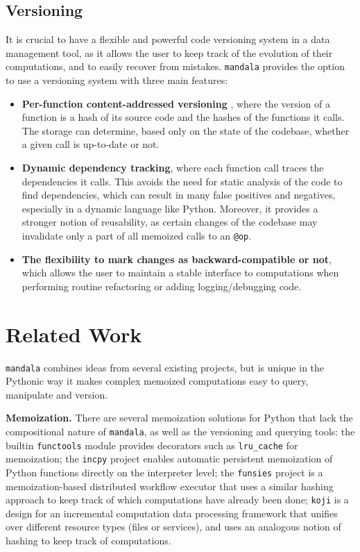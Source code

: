 \documentclass{article} %
\begin{document}
\subsection{Versioning}
\label{subsection:versioning}

It is crucial to have a flexible and powerful code versioning system in a data
management tool, as it allows the user to keep track of the evolution of their
computations, and to easily recover from mistakes. \texttt{mandala} provides the
option to use a versioning system with three main features:
\begin{itemize}
\item \textbf{Per-function content-addressed versioning} \citep{git,lozano2017unison}, where
the version of a function is a hash of its source code and the hashes of the
functions it calls. The storage can determine, based only on the state of the
codebase, whether a given call is up-to-date or not.
\item \textbf{Dynamic dependency tracking}, where each function call traces the
dependencies it calls. This avoids the need for static analysis of the code to
find dependencies, which can result in many false positives and negatives,
especially in a dynamic language like Python. Moreover, it provides a stronger
notion of reusability, as certain changes of the codebase may invalidate only
a part of all memoized calls to an \texttt{@op}.
\item \textbf{The flexibility to mark changes as backward-compatible or not},
which allows the user to maintain a stable interface to computations when performing routine refactoring or adding logging/debugging code.
\end{itemize}

\section{Related Work}
\label{section:related-work}

\texttt{mandala} combines ideas from several existing projects, but is unique in
the Pythonic way it makes complex memoized computations easy to query,
manipulate and version.

\textbf{Memoization.} There are several memoization solutions for Python that lack the compositional nature of \texttt{mandala}, as well as the versioning and
querying tools: the builtin \texttt{functools} module provides decorators such as \texttt{lru\_cache} for memoization; the \texttt{incpy} project \citep{guo2011using} enables automatic
persistent memoization of Python functions directly on the interpreter level; 
the \texttt{funsies} project \citep{lavigne2021funsies} is a memoization-based
distributed workflow executor that uses a similar hashing approach to keep track
of which computations have already been done; \texttt{koji} \citep{maymounkov2018koji} is a design for an incremental computation data processing framework that unifies over different resource types (files or services), and uses an analogous notion of hashing to keep track of computations.
\end{document}
